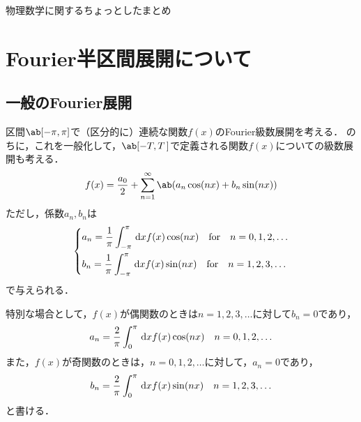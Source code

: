 %

\pagestyle{fancy}  
\fancyhead[L]{\leftmark}
\fancyhead[C]{}  
\fancyhead[R]{\textbf{\thepage}}  
\fancyfoot{}



\begin{screen}
  \centering
  \Large
  物理数学に関するちょっとしたまとめ
\end{screen}
\tableofcontents
\hrulefill
\clearpage

\section{Fourier半区間展開について}
\subsection{一般のFourier展開}
区間$\ab[-\pi, \pi]$で（区分的に）連続な関数$f(x)$のFourier級数展開を考える．
のちに，これを一般化して，$\ab[-T, T\,]$で定義される関数$f(x)$についての級数展開も考える．
\begin{gather}  
  f(x) = \frac{a_0}{2} + \sum_{n=1}^\infty \ab(a_n\cos(nx) + b_n\sin(nx))
\end{gather}
ただし，係数$a_n, b_n$は
\begin{gather}
  \begin{dcases}
    a_n = \frac{1}{\pi} \int_{-\pi}^{\pi} \dl{x} f(x) \cos (nx) \qq\text{for}\qq n = 0, 1, 2, \ldots\\
    b_n = \frac{1}{\pi} \int_{-\pi}^{\pi} \dl{x} f(x) \sin (nx) \qq\text{for}\qq n = 1, 2, 3, \ldots\\
  \end{dcases}
\end{gather}
で与えられる．

特別な場合として，$f(x)$が偶関数のときは$n = 1, 2, 3, \ldots$に対して$b_n = 0$であり，
\begin{gather}
  a_n = \frac{2}{\pi} \int_0^\pi \dl{x} f(x) \cos(nx) \qq n = 0, 1, 2, \ldots
\end{gather}
また，$f(x)$が奇関数のときは，$n = 0, 1, 2, \ldots$に対して，$a_n = 0$であり，
\begin{gather}
  b_n = \frac{2}{\pi} \int_0^\pi \dl{x} f(x) \sin(nx) \qq n = 1, 2, 3, \ldots
\end{gather}
と書ける．

